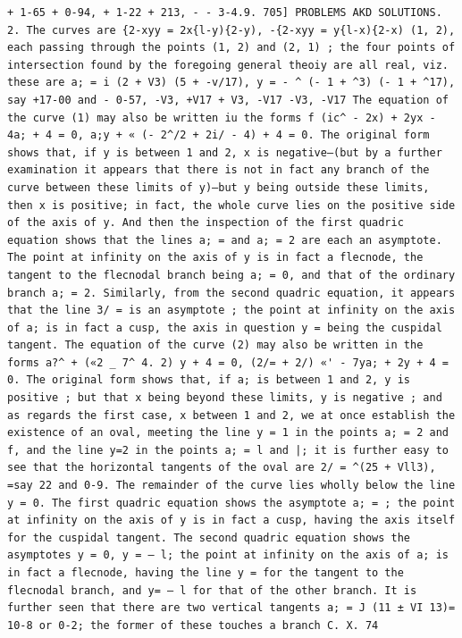 \documentclass[11pt,a4paper]{book}
\begin{document}
\newpage
\setcounter{page}{585}
\begin{verbatim}
+ 1-65 + 0-94, + 1-22 + 213, - - 3-4.9. 705] PROBLEMS AKD SOLUTIONS. 2. The curves are {2-xyy = 2x{l-y){2-y), -{2-xyy = y{l-x){2-x) (1, 2), each passing through the points (1, 2) and (2, 1) ; the four points of intersection found by the foregoing general theoiy are all real, viz. these are a; = i (2 + V3) (5 + -v/17), y = - ^ (- 1 + ^3) (- 1 + ^17), say +17-00 and - 0-57, -V3, +V17 + V3, -V17 -V3, -V17 The equation of the curve (1) may also be written iu the forms f (ic^ - 2x) + 2yx - 4a; + 4 = 0, a;y + « (- 2^/2 + 2i/ - 4) + 4 = 0. The original form shows that, if y is between 1 and 2, x is negative—(but by a further examination it appears that there is not in fact any branch of the curve between these limits of y)—but y being outside these limits, then x is positive; in fact, the whole curve lies on the positive side of the axis of y. And then the inspection of the first quadric equation shows that the lines a; = and a; = 2 are each an asymptote. The point at infinity on the axis of y is in fact a flecnode, the tangent to the flecnodal branch being a; = 0, and that of the ordinary branch a; = 2. Similarly, from the second quadric equation, it appears that the line 3/ = is an asymptote ; the point at infinity on the axis of a; is in fact a cusp, the axis in question y = being the cuspidal tangent. The equation of the curve (2) may also be written in the forms a?^ + («2 _ 7^ 4. 2) y + 4 = 0, (2/= + 2/) «' - 7ya; + 2y + 4 = 0. The original form shows that, if a; is between 1 and 2, y is positive ; but that x being beyond these limits, y is negative ; and as regards the first case, x between 1 and 2, we at once establish the existence of an oval, meeting the line y = 1 in the points a; = 2 and f, and the line y=2 in the points a; = l and |; it is further easy to see that the horizontal tangents of the oval are 2/ = ^(25 + Vll3), =say 22 and 0-9. The remainder of the curve lies wholly below the line y = 0. The first quadric equation shows the asymptote a; = ; the point at infinity on the axis of y is in fact a cusp, having the axis itself for the cuspidal tangent. The second quadric equation shows the asymptotes y = 0, y = — l; the point at infinity on the axis of a; is in fact a flecnode, having the line y = for the tangent to the flecnodal branch, and y= — l for that of the other branch. It is further seen that there are two vertical tangents a; = J (11 ± VI 13)= 10-8 or 0-2; the former of these touches a branch C. X. 74 
\end{verbatim}
\end{document}
